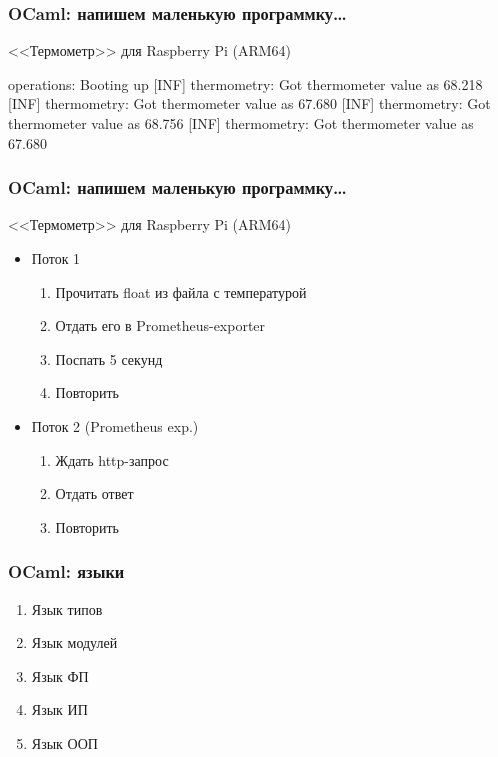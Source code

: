 \begin{frame}[fragile]
  \frametitle{OCaml: напишем маленькую программку\dots}

  \Large <<Термометр>> для Raspberry Pi (ARM64)
  \normalsize
  \begin{textcode}
  [INF] operations: Booting up
  [INF] thermometry: Got thermometer value as 68.218
  [INF] thermometry: Got thermometer value as 67.680
  [INF] thermometry: Got thermometer value as 68.756
  [INF] thermometry: Got thermometer value as 67.680
  \end{textcode}
\end{frame}

\begin{frame}
  \frametitle{OCaml: напишем маленькую программку\dots}

  \Large <<Термометр>> для Raspberry Pi (ARM64)
  \normalsize
  \begin{itemize}
    \item \large Поток 1
    \begin{enumerate}
      \item Прочитать float из файла с температурой
      \item Отдать его в Prometheus-exporter
      \item Поспать 5 секунд
      \item Повторить
    \end{enumerate}

    \item \large Поток 2 (Prometheus exp.)
    \begin{enumerate}
      \item Ждать http-запрос
      \item Отдать ответ
      \item Повторить
    \end{enumerate}
  \end{itemize}
\end{frame}

\begin{frame}
  \frametitle{OCaml: языки}

  \LARGE
  \begin{enumerate}
    \item Язык типов \pause
    \item Язык модулей \pause
    \item Язык ФП \pause
    \item Язык ИП \pause
    \item Язык ООП
  \end{enumerate}
\end{frame}

